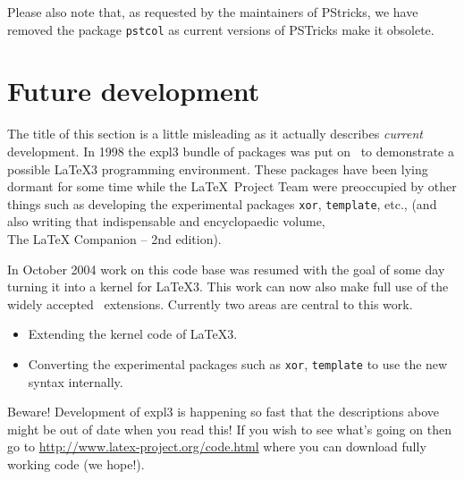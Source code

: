 \documentclass{ltnews}
\providecommand\pkg[1]{\texttt{#1}}
\begin{document}
Please also note that, as requested by the maintainers of
\textsf{PStricks}, we have removed the package \pkg{pstcol} as
current versions of \textsf{PSTricks} make it obsolete.

\newpage


\section{Future development}

The title of this section is a little misleading as it actually
describes \emph{current} development. In 1998 the \textsf{expl3}
bundle of packages was put on \ctan\ to demonstrate a possible \LaTeX3
programming environment. These packages have been lying dormant for some
time while the \LaTeX\ Project Team were preoccupied by other things
such as developing the experimental packages \pkg{xor},
\pkg{template}, etc., (and also writing that indispensable
and encyclopaedic volume,\\
The \LaTeX{} Companion -- 2nd edition).

In October 2004 work on this code base was resumed with the goal of
some day turning it into a kernel for \LaTeX3.  This work can now
also make full use of the widely accepted \eTeX\ extensions. Currently
two areas are central to this work.

\begin{itemize}
\item Extending the
  kernel code of \LaTeX3.
\item Converting the experimental packages
  such as \pkg{xor}, \pkg{template} to use the new
  syntax internally.
\end{itemize}

Beware! Development of
\textsf{expl3} is happening so fast that the descriptions above might
be out of date when you read this! If you wish to see what's going on
then go to
\url{http://www.latex-project.org/code.html} where you can download
 fully working code (we hope!).
\end{document}
